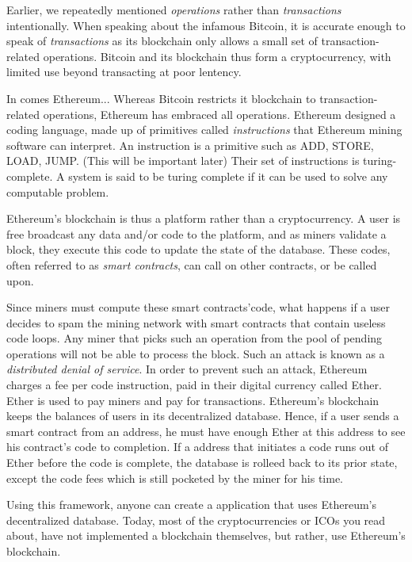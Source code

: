 Earlier, we repeatedly mentioned \emph{operations} rather than \emph{transactions} intentionally.
When speaking about the infamous Bitcoin, it is accurate enough to speak of \emph{transactions} as its blockchain
only allows a small set of transaction-related operations.
Bitcoin and its blockchain thus form a cryptocurrency, with limited use beyond transacting at poor lentency.

In comes Ethereum...
Whereas Bitcoin restricts it blockchain to transaction-related operations, Ethereum has embraced all operations.
Ethereum designed a coding language, made up of primitives called \emph{instructions} that Ethereum mining software can interpret.
An instruction is a primitive such as ADD, STORE, LOAD, JUMP. (This will be important later)
Their set of instructions is turing-complete.
A system is said to be turing complete if it can be used to solve any computable problem.

Ethereum's blockchain is thus a platform rather than a cryptocurrency.
A user is free broadcast any data and/or code to the platform, and as miners validate a block,
they execute this code to update the state of the database.
These codes, often referred to as \emph{smart contracts}, can call on other contracts, or be called upon.

Since miners must compute these smart contracts'code, what happens if a user decides to spam the mining network with
smart contracts that contain useless code loops. 
Any miner that picks such an operation from the pool of pending operations will not be able to process the block.
Such an attack is known as a \emph{distributed denial of service}.
In order to prevent such an attack, Ethereum charges a fee per code instruction, paid in their digital currency called Ether.
Ether is used to pay miners and pay for transactions.
Ethereum's blockchain keeps the balances of users in its decentralized database.
Hence, if a user sends a smart contract from an address, he must have enough Ether at this address to see his contract's code
to completion.
If a address that initiates a code runs out of Ether before the code is complete, the database is rolleed back to its prior
state, except the code fees which is still pocketed by the miner for his time.

Using this framework, anyone can create a application that uses Ethereum's decentralized database.
Today, most of the cryptocurrencies or ICOs you read about, have not implemented a blockchain themselves,
but rather, use Ethereum's blockchain.


